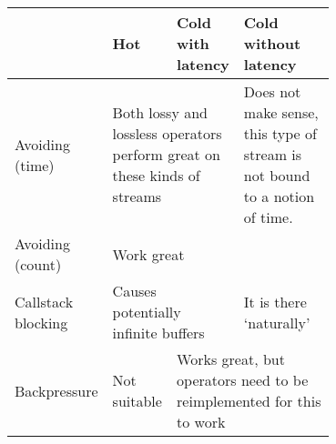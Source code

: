 \begin{tabular}[c]{| l | p{0.2\linewidth} | p{0.2\linewidth} | p{0.3\linewidth} |}
\hline
& Hot & Cold with latency & Cold without latency \\
\hline
Avoiding (time) & \multicolumn{2}{|p{0.4\linewidth}|}{Both lossy and lossless operators perform great on these kinds of streams} & Does not make sense, this type of stream is not bound to a notion of time. \\
\hline
Avoiding (count) & \multicolumn{3}{|p{0.7\linewidth}|}{Work great} \\
\hline
Callstack blocking & \multicolumn{2}{|p{0.4\linewidth}|}{Causes potentially infinite buffers} & It is there `naturally' \\
\hline
Backpressure & Not suitable & \multicolumn{2}{|p{0.5\linewidth}|}{Works great, but operators need to be reimplemented for this to work} \\
\hline
\end{tabular}
